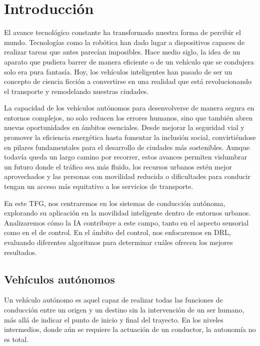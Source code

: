 \chapter{Introducción}
\label{cap:introduccion}
\setcounter{page}{1}

El avance tecnológico constante ha transformado nuestra forma de percibir el mundo. Tecnologías como la robótica han dado lugar a dispositivos capaces de realizar tareas que antes parecían imposibles. Hace medio siglo, la idea de un aparato que pudiera barrer de manera eficiente o de un vehículo que se condujera solo era pura fantasía. Hoy, los vehículos inteligentes han pasado de ser un concepto de ciencia ficción a convertirse en una realidad que está revolucionando el transporte y remodelando nuestras ciudades.

La capacidad de los vehículos autónomos para desenvolverse de manera segura en entornos complejos, no solo reducen los errores humanos, sino que también abren nuevas oportunidades en ámbitos esenciales. Desde mejorar la seguridad vial y promover la eficiencia energética hasta fomentar la inclusión social, convirtiéndose en pilares fundamentales para el desarrollo de ciudades más sostenibles. Aunque todavía queda un largo camino por recorrer, estos avances permiten vislumbrar un futuro donde el tráfico sea más fluido, los recursos urbanos estén mejor aprovechados y las personas con movilidad reducida o dificultades para conducir tengan un acceso más equitativo a los servicios de transporte.

En este \ac{TFG}, nos centraremos en los sistemas de conducción autónoma, explorando su aplicación en la movilidad inteligente dentro de entornos urbanos. Analizaremos cómo la \ac{IA} contribuye a este campo, tanto en el aspecto sensorial como en el de control. En el ámbito del control, nos enfocaremos en \ac{DRL}, evaluando diferentes algoritmos para determinar cuáles ofrecen los mejores resultados.

\section{Vehículos autónomos}
\label{sec:vehículos}

Un vehículo autónomo es aquel capaz de realizar todas las funciones de conducción entre un origen y un destino sin la intervención de un ser humano, más allá de indicar el punto de inicio y final del trayecto. En los niveles intermedios, donde aún se requiere la actuación de un conductor, la autonomía no es total.

